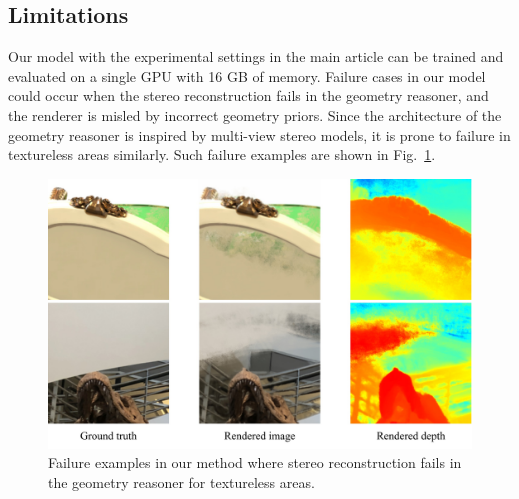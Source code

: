 \subsection{Limitations} \label{sec:c3_limitations}
Our model with the experimental settings in the main article can be trained and evaluated on a single GPU with 16 GB of memory. Failure cases in our model could occur when the stereo reconstruction fails in the geometry reasoner, and the renderer is misled by incorrect geometry priors. Since the architecture of the geometry reasoner is inspired by multi-view stereo models, it is prone to failure in textureless areas similarly. Such failure examples are shown in Fig.~\ref{fig:c3_failure}.

\begin{figure}[!t]
	\begin{center}
		\includegraphics[width=0.85\linewidth]{images/chapter3/figures/failure.jpg}
	\end{center}
	\caption{Failure examples in our method where stereo reconstruction fails in the geometry reasoner for textureless areas.}
	\label{fig:c3_failure}
\end{figure}

